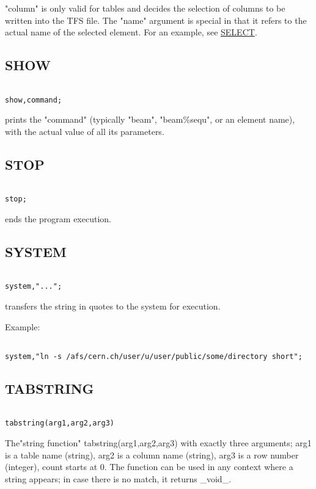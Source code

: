 "column" is only valid for tables and decides the selection of columns
to be written into the TFS file. The "name" argument is special in that
it refers to the actual name of the selected element. For an example,
see \href{../Introduction/select.html}{SELECT}.  


\subsection{SHOW}
\begin{verbatim}

show,command;
\end{verbatim} 
prints the "command" (typically "beam", "beam\%sequ", or an element
name), with the actual value of all its parameters.  


\subsection{STOP}
\begin{verbatim}

stop;
\end{verbatim} 
ends the program execution. 


\subsection{SYSTEM}
\begin{verbatim}

system,"...";
\end{verbatim} 
transfers the string in quotes to the system for execution.  

Example: 
\begin{verbatim}

system,"ln -s /afs/cern.ch/user/u/user/public/some/directory short";
\end{verbatim}


\subsection{TABSTRING}
\begin{verbatim}

tabstring(arg1,arg2,arg3)
\end{verbatim}  
The"string function" tabstring(arg1,arg2,arg3) with exactly  three
arguments; arg1 is a table name (string), arg2 is a column name
(string), arg3 is a row number (integer), count starts at 0. The
function can be used in any context where a string appears; in case
there is no match, it returns \_void\_.  


